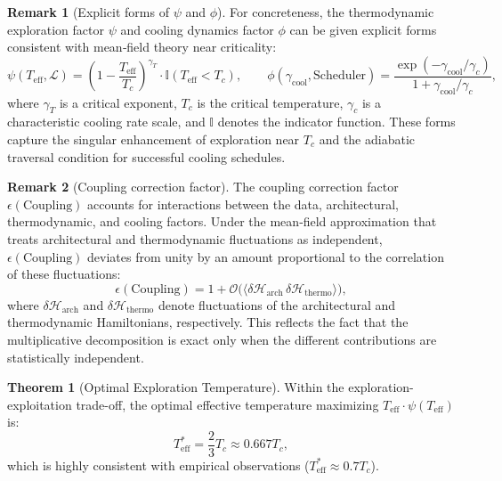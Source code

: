 \documentclass[11pt, a4paper]{article}
\theoremstyle{definition}
\newtheorem{theorem}{Theorem}[section]
\newtheorem{remark}{Remark}[section]
\begin{document}
\begin{remark}[Explicit forms of $\psi$ and $\phi$]
For concreteness, the thermodynamic exploration factor $\psi$ and cooling dynamics factor $\phi$ can be given explicit forms consistent with mean‑field theory near criticality:
\begin{equation}
\psi(T_{\text{eff}}, \mathcal{L}) = \left( 1 - \frac{T_{\text{eff}}}{T_c} \right)^{\gamma_T} \cdot \mathbb{I}(T_{\text{eff}} < T_c),
\qquad
\phi(\gamma_{\text{cool}}, \text{Scheduler}) = \frac{\exp(-\gamma_{\text{cool}}/\gamma_c)}{1 + \gamma_{\text{cool}}/\gamma_c},
\end{equation}
where $\gamma_T$ is a critical exponent, $T_c$ is the critical temperature, $\gamma_c$ is a characteristic cooling rate scale, and $\mathbb{I}$ denotes the indicator function. These forms capture the singular enhancement of exploration near $T_c$ and the adiabatic traversal condition for successful cooling schedules.
\end{remark}

\begin{remark}[Coupling correction factor]
The coupling correction factor $\epsilon(\text{Coupling})$ accounts for interactions between the data, architectural, thermodynamic, and cooling factors. Under the mean‑field approximation that treats architectural and thermodynamic fluctuations as independent, $\epsilon(\text{Coupling})$ deviates from unity by an amount proportional to the correlation of these fluctuations:
\begin{equation}
\epsilon(\text{Coupling}) = 1 + \mathcal{O}\big(\langle \delta\mathcal{H}_{\text{arch}} \,\delta\mathcal{H}_{\text{thermo}} \rangle\big),
\end{equation}
where $\delta\mathcal{H}_{\text{arch}}$ and $\delta\mathcal{H}_{\text{thermo}}$ denote fluctuations of the architectural and thermodynamic Hamiltonians, respectively. This reflects the fact that the multiplicative decomposition is exact only when the different contributions are statistically independent.
\end{remark}

\begin{theorem}[Optimal Exploration Temperature]
\label{thm:optimal-temp}
Within the exploration-exploitation trade-off, the optimal effective temperature maximizing $T_{\text{eff}} \cdot \psi(T_{\text{eff}})$ is:
\begin{equation}
    \boxed{T_{\text{eff}}^* = \frac{2}{3}T_c \approx 0.667T_c},
\end{equation}
which is highly consistent with empirical observations ($T_{\text{eff}}^* \approx 0.7T_c$).
\end{theorem}
\end{document}
